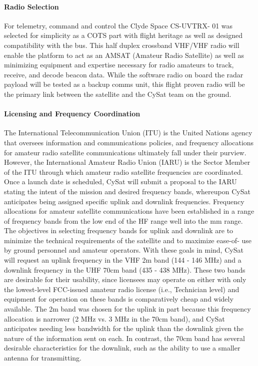 \documentclass[nocover]            %
{CSLI}                       %
\begin{document}
\paragraph{Radio Selection\\}
For telemetry, command and control the Clyde Space CS-UVTRX- 01 was selected for simplicity as a COTS part with flight heritage as well as designed compatibility with the bus. This half duplex crossband VHF/VHF radio will enable the platform to act as an AMSAT (Amateur Radio Satellite) as well as minimizing equipment and expertise necessary for radio amateurs to track, receive, and decode beacon data. While the software radio on board the radar payload will be tested as a backup comms unit, this flight proven radio will be the primary link between the satellite and the CySat team on the ground.
\paragraph{Licensing and Frequency Coordination\\}
The International Telecommunication Union (ITU) is the United Nations agency that oversees information and communications policies, and frequency allocations for amateur radio satellite communications ultimately fall under their purview. However, the International Amateur Radio Union (IARU) is the Sector Member of the ITU through which amateur radio satellite frequencies are coordinated. Once a launch date is scheduled, CySat will submit a proposal to the IARU stating the intent of the mission and desired frequency bands, whereupon CySat anticipates being assigned specific uplink and downlink frequencies. Frequency allocations for amateur satellite communications have been established in a range of frequency bands from the low end of the HF range well into the mm range. The objectives in selecting frequency bands for uplink and downlink are to minimize the technical requirements of the satellite and to maximize ease-of- use by ground personnel and amateur operators. With these goals in mind, CySat will request an uplink frequency in the VHF 2m band (144 - 146 MHz) and a downlink frequency in the UHF 70cm band (435 - 438 MHz). These two bands are desirable for their usability, since licensees may operate on either with only the lowest-level FCC-issued amateur radio license (i.e., Technician level) and equipment for operation on these bands is comparatively cheap and widely available. The 2m band was chosen for the uplink in part because this frequency allocation is narrower (2 MHz vs. 3 MHz in the 70cm band), and CySat anticipates needing less bandwidth for the uplink than the downlink given the nature of the information sent on each. In contrast, the 70cm band has several desirable characteristics for the downlink, such as the ability to use a smaller antenna for transmitting.
\end{document}
